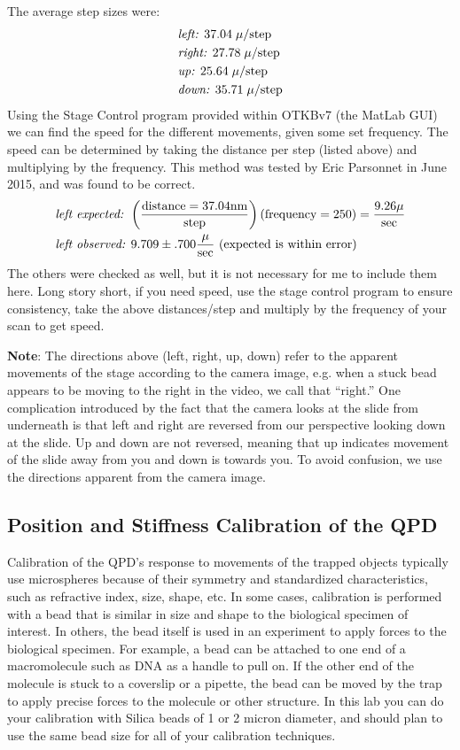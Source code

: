 \documentclass{../lab}
\begin{document}
The average step sizes were:
\begin{align*}
    &\emph{left: } 37.04 \;\mu/\text{step} \\
    &\emph{right: } 27.78 \;\mu/\text{step} \\
    &\emph{up: } 25.64 \;\mu/\text{step} \\
    &\emph{down: } 35.71 \;\mu/\text{step}
\end{align*}
Using the Stage Control program provided within OTKBv7 (the MatLab GUI) we can find the speed for the different movements, given some set frequency. The speed can be determined by taking the distance per step (listed above) and multiplying by the frequency. This method was tested by Eric Parsonnet in June 2015, and was found to be correct.
\begin{align*}
    &\emph{left expected: } \left(\frac{\text{distance} = 37.04 \text{nm}}{\text{step}}\right)(\text{frequency} = 250)=\frac{9.26 \mu}{\text{sec}} \\
    &\emph{left observed: } 9.709 \pm .700 \frac{\mu}{\text{sec}} \text{ (expected is within error)}
\end{align*}
The others were checked as well, but it is not necessary for me to include them here. Long story short, if you need speed, use the stage control program to ensure consistency, take the above distances/step and multiply by the frequency of your scan to get speed.

\textbf{Note}: The directions above (left, right, up, down) refer to the apparent movements of the stage according to the camera image, e.g. when a stuck bead appears to be moving to the right in the video, we call that ``right.'' One complication introduced by the fact that the camera looks at the slide from underneath is that left and right are reversed from our perspective looking down at the slide. Up and down are not reversed, meaning that up indicates movement of the slide away from you and down is towards you. To avoid confusion, we use the directions apparent from the camera image.

\subsection{Position and Stiffness Calibration of the QPD}

Calibration of the QPD's response to movements of the trapped objects typically use microspheres because of their symmetry and standardized characteristics, such as refractive index, size, shape, etc. In some cases, calibration is performed with a bead that is similar in size and shape to the biological specimen of interest. In others, the bead itself is used in an experiment to apply forces to the biological specimen. For example, a bead can be attached to one end of a macromolecule such as DNA as a handle to pull on. If the other end of the molecule is stuck to a coverslip or a pipette, the bead can be moved by the trap to apply precise forces to the molecule or other structure. In this lab you can do your calibration with Silica beads of 1 or 2 micron diameter, and should plan to use the same bead size for all of your calibration techniques.
\end{document}
